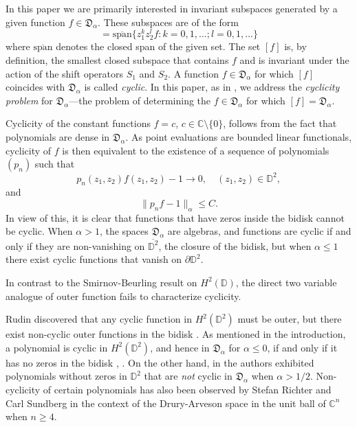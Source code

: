 \documentclass[11 pt,reqno]{amsart}
\theoremstyle{definition}
\theoremstyle{remark}
\numberwithin{equation}{section} \numberwithin{figure}{section}
\begin{document}
In this paper we are primarily interested in 
invariant subspaces generated by a given function $f\in
\mathfrak{D}_{\alpha}$. 
These subspaces are of the form 
\begin{equation*}
[f]=\overline{\textrm{span}}\{z_1^kz_2^lf\colon k=0,1, \ldots; l=0, 1, \ldots\}
\end{equation*}
where $\overline{\text{span}}$ denotes the closed span of the given
set.  The set $[f]$ is, by definition, the smallest closed subspace
that contains $f$ and is invariant under the action of the shift
operators $S_1$ and $S_2$. A function $f\in \mathfrak{D}_{\alpha}$ for
which $[f]$ coincides with $\mathfrak{D}_{\alpha}$ is called {\it
  cyclic}. In this paper, as in \cite{BCLSS13II}, we address the {\it
  cyclicity problem} for $\mathfrak{D}_{\alpha}$---the problem of
determining the $f\in \mathfrak{D}_{\alpha}$ for which
$[f]=\mathfrak{D}_{\alpha}$.

Cyclicity of the constant functions $f=c$, $c\in \mathbb{C}
\setminus \{0\}$,
follows from the fact that polynomials are dense in $\mathfrak{D}_{\alpha}$. As
point evaluations are bounded linear functionals, cyclicity of $f$ is then
equivalent to the existence of a sequence of polynomials $(p_n)$ such that
\[p_n(z_1,z_2)f(z_1,z_2)-1\longrightarrow 0, \quad (z_1,z_2)\in \mathbb{D}^2,\]
and
\[\|p_nf-1\|_{\alpha}\le C.\]
In view of this, it is clear that functions that have zeros inside the bidisk
cannot be cyclic.  When $\alpha>1$, the spaces $\mathfrak{D}_{\alpha}$ are
 algebras, and functions are cyclic if and only if they are
non-vanishing on $\overline{\mathbb{D}^2}$, the
closure of the bidisk,
but when $\alpha\leq 1$ there exist cyclic functions that vanish on $\partial \mathbb{D}^2$.

In contrast to the Smirnov-Beurling result on $H^2({{\mathbb D}})$, 
the direct two variable analogue of outer function fails to
characterize cyclicity.

Rudin discovered that any cyclic function in $H^2({{\mathbb D}}^2)$ must
be outer, but there exist non-cyclic outer functions in the
bidisk \cite{RudBook}. 
As mentioned in the introduction, a polynomial is cyclic in
$H^2({{\mathbb D}}^2)$, and hence in ${\mathfrak{D}_{\alpha}}$ for ${\alpha} \leq 0$, if and only if it
has no zeros in the bidisk \cite{NGN}, \cite{Gel95}.  On the other
hand, in \cite{BCLSS13II} the authors exhibited polynomials without
zeros in $\mathbb{D}^2$ that are {\it not} cyclic in
$\mathfrak{D}_{\alpha}$ when $\alpha>1/2$.  Non-cyclicity of certain
polynomials has also been observed by Stefan Richter and Carl Sundberg
\cite{RSslides} in the context of the Drury-Arveson space in the unit
ball of $\mathbb{C}^n$ when $n\geq 4$.
\end{document}

